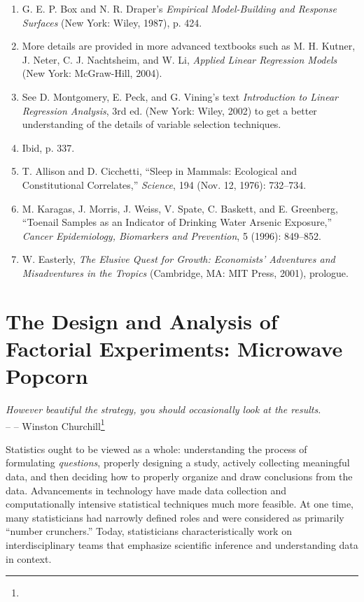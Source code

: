 \documentclass[
]{book}
\begin{document}
\begin{enumerate}
  \item G. E. P. Box and N. R. Draper’s \textit{Empirical Model-Building and Response Surfaces} (New York: Wiley, 1987), p. 424.
  \item More details are provided in more advanced textbooks such as M. H. Kutner, J. Neter, C. J. Nachtsheim, and W. Li, \textit{Applied Linear Regression Models} (New York: McGraw-Hill, 2004).
  \item See D. Montgomery, E. Peck, and G. Vining’s text \textit{Introduction to Linear Regression Analysis}, 3rd ed. (New York: Wiley, 2002) to get a better understanding of the details of variable selection techniques.
  \item Ibid, p. 337.
  \item T. Allison and D. Cicchetti, “Sleep in Mammals: Ecological and Constitutional Correlates,” \textit{Science}, 194 (Nov. 12, 1976): 732–734.
  \item M. Karagas, J. Morris, J. Weiss, V. Spate, C. Baskett, and E. Greenberg, “Toenail Samples as an Indicator of Drinking Water Arsenic Exposure,” \textit{Cancer Epidemiology, Biomarkers and Prevention}, 5 (1996): 849–852.
  \item W. Easterly, \textit{The Elusive Quest for Growth: Economists’ Adventures and Misadventures in the Tropics} (Cambridge, MA: MIT Press, 2001), prologue.
\end{enumerate}

\hypertarget{the-design-and-analysis-of-factorial-experiments-microwave-popcorn}{%
\chapter{The Design and Analysis of Factorial Experiments: Microwave Popcorn}\label{the-design-and-analysis-of-factorial-experiments-microwave-popcorn}}

\begin{flushright}
\emph{However beautiful the strategy, you should occasionally look at the results.} \\
-- -- Winston Churchill\footnote{    }
\end{flushright}

Statistics ought to be viewed as a whole: understanding the process of formulating \emph{questions}, properly designing a study, actively collecting meaningful data, and then deciding how to properly organize and draw conclusions from the data. Advancements in technology have made data collection and computationally intensive statistical techniques much more feasible. At one time, many statisticians had narrowly defined roles and were considered as primarily ``number crunchers.'' Today, statisticians characteristically work on interdisciplinary teams that emphasize scientific inference and understanding data in context.
\end{document}
